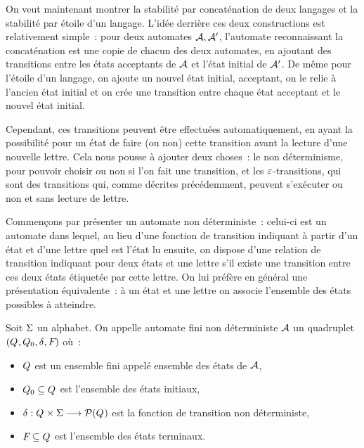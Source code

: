 On veut maintenant montrer la stabilité par concaténation de deux langages et
la stabilité par étoile d'un langage. L'idée derrière ces deux constructions est
relativement simple~: pour deux automates $\mathcal{A},\mathcal{A}'$, l'automate
reconnaissant la concaténation est une copie de chacun des deux automates, en
ajoutant des transitions entre les états acceptants de $\mathcal{A}$ et l'état
initial de $\mathcal{A}'$. De même pour l'étoile d'un langage, on ajoute un nouvel
état initial, acceptant, on le relie à l'ancien état initial et on crée une
transition entre chaque état acceptant et le nouvel état initial.

Cependant, ces transitions peuvent être effectuées automatiquement, en ayant la
possibilité pour un état de faire (ou non) cette transition avant la lecture
d'une nouvelle lettre. Cela nous pousse à ajouter deux choses~: le non
déterminisme, pour pouvoir choisir ou non si l'on fait une transition, et les
$\varepsilon$-transitions, qui sont des transitions qui, comme décrites précédemment,
peuvent s'exécuter ou non et sans lecture de lettre.

Commençons par présenter un automate non déterministe~: celui-ci est un automate
dans lequel, au lieu d'une fonction de transition indiquant à partir d'un état
et d'une lettre quel est l'état lu ensuite, on dispose d'une relation de
transition indiquant pour deux états et une lettre s'il existe une transition
entre ces deux états étiquetée par cette lettre. On lui préfère en général une
présentation équivalente~: à un état et une lettre on associe l'ensemble des
états possibles à atteindre.

\begin{definition}
  Soit $\Sigma$ un alphabet. On appelle automate fini non déterministe $\mathcal{A}$
  un quadruplet $(Q_{},Q_{0},\delta_{},F_{})$ où~:
  \begin{itemize}
  \item $Q_{}$ est un ensemble fini appelé ensemble des états de $\mathcal{A}$,
  \item $Q_{0}\subseteq Q_{}$ est l'ensemble des états initiaux,
  \item $\delta_{} : \displaystyle Q_{}\times\Sigma \longrightarrow \mathcal{P}(Q_{})$ est la
    fonction de transition non déterministe,
  \item $F_{}\subseteq Q_{}$ est l'ensemble des états terminaux.
  \end{itemize}
\end{definition}

